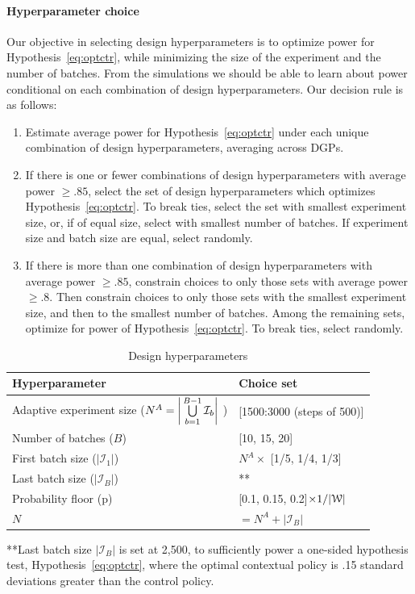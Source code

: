 \documentclass[letterpaper, 12pt, parskip=full,DIV=10]{scrartcl}
\begin{document}
\paragraph{Hyperparameter choice}
Our objective in selecting design hyperparameters is to optimize power for Hypothesis~\ref{eq:optctr}, while minimizing the size of the experiment and the number of batches. From the simulations we should be able to learn about power conditional on each combination of design hyperparameters. Our decision rule is as follows:
\begin{enumerate}
\item Estimate average power for Hypothesis~\ref{eq:optctr} under each unique combination of design hyperparameters, averaging across DGPs. 
\item If there is one or fewer combinations of design hyperparameters with average power $\ge.85$, select the set of design hyperparameters which optimizes Hypothesis~\ref{eq:optctr}. To break ties, select the set with smallest experiment size, or, if of equal size, select with smallest number of batches. If experiment size and batch size are equal, select randomly. 
\item If there is more than one combination of design hyperparameters with average power $\ge.85$, constrain choices to only those sets with average power $\ge.8$. Then constrain choices to only those sets with the smallest experiment size, and then to the smallest number of batches. Among the remaining sets, optimize for power of Hypothesis~\ref{eq:optctr}. To break ties, select randomly. 
\end{enumerate}

\begin{table}[H]
\centering
\caption{Design hyperparameters} 
\label{tab:design}
\begin{tabular}{l | l}
\textbf{Hyperparameter} & \textbf{Choice set} \\ \hline
Adaptive experiment size ($N^A = \bigg{\lvert} \bigcup\limits_{b=1}^{B-1} \mathcal{I}_{b} \bigg{\rvert}$ )& [1500:3000 (steps of 500)] \\
Number of batches ($B$)& [10, 15, 20] \\
First batch size ($|\mathcal{I}_1|$) & $N^A \times$ [1/5, 1/4, 1/3] \\
Last batch size ($|\mathcal{I}_B|$) & **  \\
Probability floor (p)& [0.1, 0.15, 0.2]$\times 1/ |{\EuScript W}|$ \\
$N$ & $=N^A + |\mathcal{I}_B| $\\
\hline
\end{tabular}
\end{table}
**Last batch size $|\mathcal{I}_B|$ is set at 2,500, to sufficiently power a one-sided hypothesis test, Hypothesis~\ref{eq:optctr}, where the optimal contextual policy is .15 standard deviations greater than the control policy. 
\end{document}
